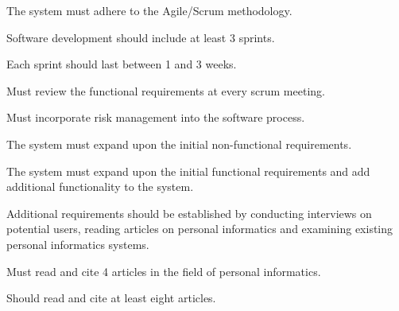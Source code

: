 \renewcommand*{\arraystretch}{1.4}
\begin{reqtable}

  \reqheader

  {The system must adhere to the Agile/Scrum methodology.}
  \phigh
  \dnone
  \sspec

  {Software development should include at least 3 sprints.}
  \pmed
  \deps{\ref{req:agile-scrum}, \ref{req:1-3-weeks}}
  \sspec

  {Each sprint should last between 1 and 3 weeks.}
  \pmed
  \deps{\ref{req:agile-scrum}, \ref{req:3-sprints}}
  \sspec

  {Must review the functional requirements at every scrum meeting.}
  \phigh
  \deps{\ref{req:1-3-weeks}}
  \sspec

  {Must incorporate risk management into the software process.}
  \phigh
  \deps{\ref{req:agile-scrum}}
  \sspec


  \reqheader

  {The system must expand upon the initial non-functional requirements.}
  \phigh
  \dnone
  \sspec

  {The system must expand upon the initial functional requirements and add additional functionality
    to the system.}
  \phigh
  \dnone
  \sspec

  {Additional requirements should be established by conducting interviews on potential users,
    reading articles on personal informatics and examining existing personal informatics systems.}
  \phigh
  \deps{\ref{req:expand-non-func}, \ref{req:expand-func}}
  \sspec


  \reqheader

  {Must read and cite 4 articles in the field of personal informatics.}
  \phigh
  \dnone
  \sspec

  {Should read and cite at least eight articles.}
  \pmed
  \dnone
  \sspec


\end{reqtable}
